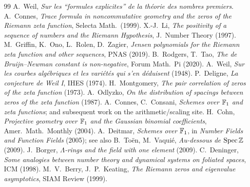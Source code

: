 \documentclass[11pt]{article}
\begin{document}
\begin{thebibliography}{99}
 A.~Weil, \emph{Sur les ``formules explicites'' de la th\'eorie des
nombres premiers}.
 A.~Connes, \emph{Trace formula in noncommutative geometry and the
zeros of the Riemann zeta function}, Selecta Math.\ (1999).
 X.-J.~Li, \emph{The positivity of a sequence of numbers and the Riemann
Hypothesis}, J.\ Number Theory (1997).
 M.~Griffin, K.~Ono, L.~Rolen, D.~Zagier, \emph{Jensen polynomials for
the Riemann zeta function and other sequences}, PNAS (2019).
 B.~Rodgers, T.~Tao, \emph{The de Bruijn--Newman constant is
non-negative}, Forum Math.\ Pi (2020).
 A.~Weil, \emph{Sur les courbes alg\'ebriques et les vari\'et\'es qui
s'en d\'eduisent} (1948).
 P.~Deligne, \emph{La conjecture de Weil I}, IHES (1974).
 H.~Montgomery, \emph{The pair correlation of zeros of the zeta
function} (1973).
 A.~Odlyzko, \emph{On the distribution of spacings between zeros of
the zeta function} (1987).
 A.~Connes, C.~Consani, \emph{Schemes over $\mathbb{F}_1$ and zeta
functions}; and subsequent work on the arithmetic/scaling site.
 H.~Cohn, \emph{Projective geometry over $\mathbb{F}_1$ and the Gaussian
binomial coefficients}, Amer.\ Math.\ Monthly (2004).
 A.~Deitmar, \emph{Schemes over $\mathbb{F}_1$}, in \emph{Number Fields and
Function Fields} (2005); see also B.~To\"en, M.~Vaqui\'e, \emph{Au-dessous de
$\operatorname{Spec}\mathbb{Z}$} (2009).
 J.~Borger, \emph{$\Lambda$-rings and the field with one element}
(2009).
 C.~Deninger, \emph{Some analogies between number theory and
dynamical systems on foliated spaces}, ICM (1998).
 M.~V.~Berry, J.~P.~Keating, \emph{The Riemann zeros and
eigenvalue asymptotics}, SIAM Review (1999).
\end{thebibliography}
\end{document}
